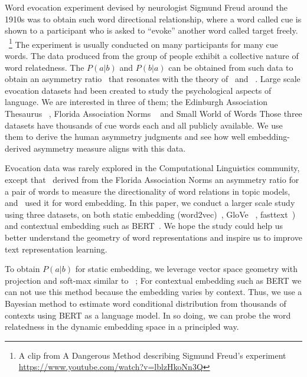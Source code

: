\documentclass[letterpaper]{article} %
\begin{document}
Word evocation experiment devised by neurologist Sigmund Freud around the 1910s was to obtain such word directional relationship, where a word called cue is shown to a participant who is asked to ``evoke'' another word called target freely. ~\footnote{A clip from A Dangerous Method describing Sigmund Freud's experiment \url{https://www.youtube.com/watch?v=lblzHkoNn3Q}} The experiment is usually conducted on many participants for many cue words. The data produced from the group of people exhibit a collective nature of word relatedness. The $P(a|b)$ and $P(b|a)$ can be obtained from such data to obtain an asymmetry ratio~\citep{griffiths2007topics} that resonates with the theory of~\citet{tversky1977features} and ~\citet{Resnik:1995:UIC:1625855.1625914}.
Large scale evocation datasets had been created to study the psychological aspects of language. We are interested in three of them; the Edinburgh Association Thesaurus
~\citep{kiss1973associative}, Florida Association Norms
~\citep{nelson2004university} and Small World of Words
\cite{de2019small}
Those three datasets have thousands of cue words each and all publicly available. We use them to derive the human asymmetry judgments and see how well embedding-derived asymmetry measure aligns with this data.

Evocation data was rarely explored in the Computational Linguistics community, except that~\citet{griffiths2007topics} derived from the Florida Association Norms an asymmetry ratio for a pair of words to measure the directionality of word relations in topic models, and~\citet{nematzadeh2017evaluating} used it for word embedding. In this paper, we conduct a larger scale study using three datasets, on both static embedding (word2vec)~\citep{mikolov2013distributed}, GloVe ~\citep{pennington2014glove}, fasttext~\citep{mikolov2018advances}) and contextual embedding such as BERT~\citep{devlin2018bert}. We hope the study could help us better understand the geometry of word representations and inspire us to improve text representation learning.

To obtain $P(a|b)$ for static embedding, we leverage vector space geometry with projection and soft-max similar to ~\citep{nematzadeh2017evaluating,Levy2014NeuralWE,arora-etal-2016-latent}; For contextual embedding such as BERT we can not use this method because the embedding varies by context. Thus, we use a Bayesian method to estimate word conditional distribution from thousands of contexts using BERT as a language model. In so doing, we can probe the word relatedness in the dynamic embedding space in a principled way.
\end{document}
